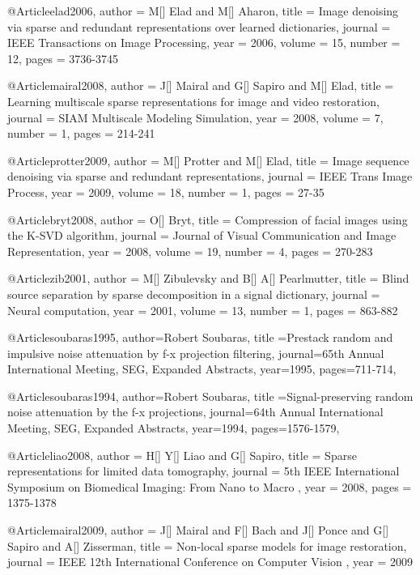 @Article{elad2006,
  author = 	 {M[] Elad and M[] Aharon},
  title = 	 {Image denoising via sparse and redundant representations over learned dictionaries},
  journal = 	 {IEEE Transactions on Image Processing},
  year = 	 2006,
  volume = 	 15,
  number = 	 12,
  pages = 	 {3736-3745}}

@Article{mairal2008,
  author = 	 {J[] Mairal and G[] Sapiro and M[] Elad},
  title = 	 {Learning multiscale sparse representations for image and video restoration},
  journal = 	 {SIAM Multiscale Modeling Simulation},
  year = 	 2008,
  volume = 	 7,
  number = 	 1,
  pages = 	 {214-241}}


@Article{protter2009,
  author = 	 {M[] Protter and M[] Elad},
  title = 	 {Image sequence denoising via sparse and redundant representations},
  journal = 	 {IEEE Trans Image Process},
  year = 	 2009,
  volume = 	 18,
  number = 	 1,
  pages = 	 {27-35}}

@Article{bryt2008,
  author = 	 {O[] Bryt},
  title = 	 {Compression of facial images using the {K}-{SVD} algorithm},
  journal = 	 {Journal of Visual Communication and Image Representation},
  year = 	 2008,
  volume = 	 19,
  number = 	 4,
  pages = 	 {270-283}}

@Article{zib2001,
  author = 	 {M[] Zibulevsky and B[] A[] Pearlmutter},
  title = 	 {Blind source separation by sparse decomposition in a signal dictionary},
  journal = 	 {Neural computation},
  year = 	 2001,
  volume = 	 13,
  number = 	 1,
  pages = 	 {863-882}}

@Article{soubaras1995,
  author={Robert Soubaras},
  title ={Prestack random and impulsive noise attenuation by f-x projection filtering},
  journal={65th Annual International Meeting, SEG, Expanded Abstracts},
  year=1995,
  pages={711-714},
}

@Article{soubaras1994,
  author={Robert Soubaras},
  title ={Signal-preserving random noise attenuation by the f-x projections},
  journal={64th Annual International Meeting, SEG, Expanded Abstracts},
  year=1994,
  pages={1576-1579},
}

@Article{liao2008,
  author = 	 {H[] Y[] Liao and G[] Sapiro},
  title = 	 {Sparse representations for limited data tomography},
  journal = 	 {5th IEEE International Symposium on Biomedical Imaging: From Nano to Macro },
  year = 	 2008,
  pages = 	 {1375-1378}}

@Article{mairal2009,
  author = 	 {J[] Mairal and F[] Bach and J[] Ponce and G[] Sapiro and A[] Zisserman},
  title = 	 {Non-local sparse models for image restoration},
  journal = 	 {IEEE 12th International Conference on Computer Vision  },
  year = 	 2009}


